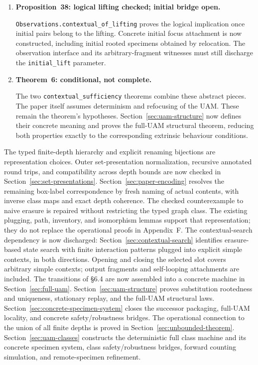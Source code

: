\begin{enumerate}
Section~\ref{sec:concrete-specimen-system} proves the safety and robustness bridges for the constructed named-state \texttt{SpecimenSystem}.
\item \textbf{Proposition~38: logical lifting checked; initial bridge open.}\par
\texttt{Observations.contextual\_of\_lifting} proves the logical implication
once initial pairs belong to the lifting. Concrete initial focus attachment is
now constructed, including initial rooted specimens obtained by relocation.
The observation interface and its arbitrary-fragment witnesses must still
discharge the \texttt{initial\_lift} parameter.
\item \textbf{Theorem~6: conditional, not complete.}\par
The two \texttt{contextual\_sufficiency} theorems combine these abstract pieces.
The paper itself assumes determinism and refocusing of the UAM. These remain
the theorem's hypotheses. Section~\ref{sec:uam-structure} now defines their
concrete meaning and proves the full-UAM structural theorem, reducing both
properties exactly to the corresponding extrinsic behaviour conditions.
\end{enumerate}

The typed finite-depth hierarchy and explicit renaming bijections are
representation choices. Outer set-presentation normalization, recursive annotated round trips, and
compatibility across depth bounds are now checked in
Section~\ref{sec:set-presentations}. Section~\ref{sec:paper-encoding} resolves the remaining box-label correspondence
by fresh naming of actual contents, with inverse class maps and exact depth
coherence. The checked counterexample to naive erasure is repaired without
restricting the typed graph class. The existing plugging,
path, inventory, and isomorphism lemmas support that representation; they do
not replace the operational proofs in Appendix~F. The contextual-search dependency is now discharged:
Section~\ref{sec:contextual-search} identifies erasure-based state search with
finite interaction patterns plugged into explicit simple contexts, in both
directions. Opening and closing the selected slot covers arbitrary simple
contexts; output fragments and self-looping attachments are included.
The transitions of \S6.4 are now assembled into a concrete machine in
Section~\ref{sec:full-uam}. Section~\ref{sec:uam-structure} proves substitution
rootedness and uniqueness, stationary replay, and the full-UAM structural laws.
Section~\ref{sec:concrete-specimen-system} closes the successor packaging,
full-UAM locality, and concrete safety/robustness bridges. The operational connection to the union of all finite depths is proved in Section~\ref{sec:unbounded-theorem}. Section~\ref{sec:uam-classes} constructs the deterministic full
class machine and its concrete specimen system, class safety/robustness
bridges, forward counting simulation, and remote-specimen refinement.

